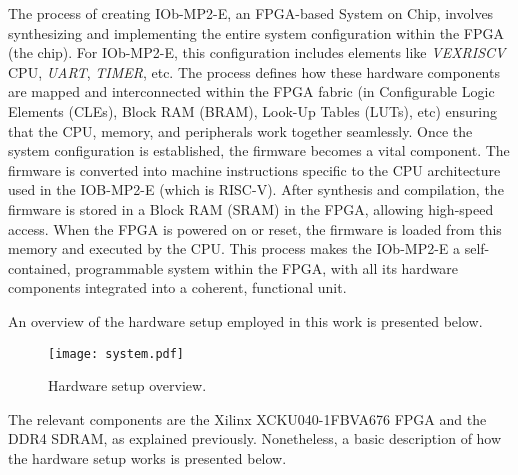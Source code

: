 The process of creating IOb-MP2-E, an FPGA-based System on Chip, involves synthesizing and implementing the entire system configuration within the FPGA (the chip). For IOb-MP2-E, this configuration includes elements like \textit{VEXRISCV} CPU, \textit{UART}, \textit{TIMER}, etc.
The process defines how these hardware components are mapped and interconnected within the FPGA fabric (in Configurable Logic Elements (CLEs), Block RAM (BRAM), Look-Up Tables (LUTs), etc) ensuring that the CPU, memory, and peripherals work together seamlessly.
Once the system configuration is established, the firmware becomes a vital component. The firmware is converted into machine instructions specific to the CPU architecture used in the IOB-MP2-E (which is RISC-V). After synthesis and compilation, the firmware is stored in a Block RAM (SRAM) in the FPGA, allowing high-speed access. When the FPGA is powered on or reset, the firmware is loaded from this memory and executed by the CPU.  
This process makes the IOb-MP2-E a self-contained, programmable system within the FPGA, with all its hardware components integrated into a coherent, functional unit.

An overview of the hardware setup employed in this work is presented below.

\vspace{0.1cm}

\begin{figure}[H]
\centerline{\texttt{[image: system.pdf]}}
\caption{Hardware setup overview.}
\label{system}
\end{figure}

The relevant components are the Xilinx XCKU040-1FBVA676 FPGA and the DDR4 SDRAM, as explained previously. Nonetheless, a basic description of how the hardware setup works is presented below.

